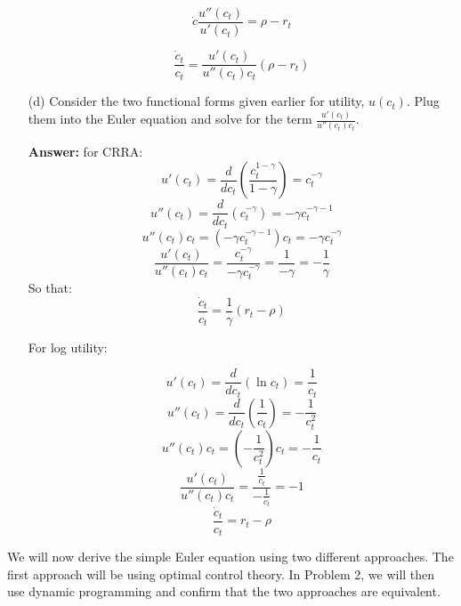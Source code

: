 \documentclass[11pt]{extarticle}
\theoremstyle{plain}
\theoremstyle{definition}
\begin{document}
\begin{enumerate}
   \[
   \dot{c} \frac{u''(c_t)}{u'(c_t)} = \rho - r_t
   \]

\[
\frac{ \dot{c}_t }{ c_t } = \frac{u'(c_t)}{ u''(c_t) c_t} (\rho  - r_t )
\]

	
\item [(d)] Consider the two functional forms given earlier for utility, $u(c_t)$. Plug them into the Euler equation and solve for the term $\frac{u'(c_t)}{ u''(c_t) c_t}$.

\textbf{Answer:} for CRRA:
\[
u'(c_t) = \frac{ d }{ d c_t } \left( \frac{ c_t^{ 1 - \gamma } }{ 1 - \gamma } \right ) = c_t^{ -\gamma }
\]
\[
u''(c_t) = \frac{ d }{ d c_t } \left( c_t^{ -\gamma } \right ) = -\gamma c_t^{ -\gamma - 1 }
\]
\[
u''(c_t) c_t = \left( -\gamma c_t^{ -\gamma - 1 } \right ) c_t = -\gamma c_t^{ -\gamma }
\]
\[
\frac{ u'(c_t) }{ u''(c_t) c_t } = \frac{ c_t^{ -\gamma } }{ -\gamma c_t^{ -\gamma } } = \frac{ 1 }{ -\gamma } = -\frac{ 1 }{ \gamma }
\]
So that:
\[
\frac{ \dot{c}_t }{ c_t } = \frac{1}{\gamma} (r_t  - \rho )
\]


For log utility:

\[
u'(c_t) = \frac{ d }{ d c_t } ( \ln c_t ) = \frac{ 1 }{ c_t }
\]
\[
u''(c_t) = \frac{ d }{ d c_t } \left( \frac{ 1 }{ c_t } \right ) = -\frac{ 1 }{ c_t^2 }
\]
\[
u''(c_t) c_t = \left( -\frac{ 1 }{ c_t^2 } \right ) c_t = -\frac{ 1 }{ c_t }
\]
\[
\frac{ u'(c_t) }{ u''(c_t) c_t } = \frac{ \frac{ 1 }{ c_t } }{ -\frac{ 1 }{ c_t } } = -1
\]
\[
\frac{ \dot{c}_t }{ c_t } = r_t  - \rho 
\]
\end{enumerate}


\vspace{6mm}
\noindent
We will now derive the simple Euler equation using two different approaches. The first approach will be using optimal control theory. In Problem 2, we will then use dynamic programming and confirm that the two approaches are equivalent.
\end{document}
